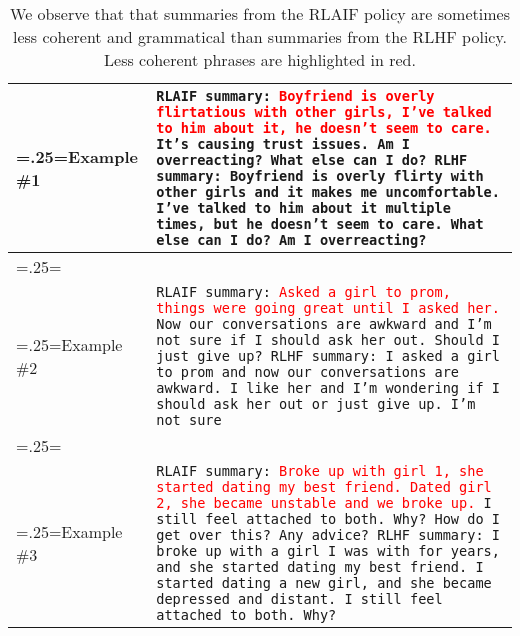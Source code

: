 \documentclass[11pt]{article}
\begin{document}
\begin{table*}[ht]
\small
\centering

    \begin{tabularx}{\linewidth}{>{\hsize=.25\hsize\linewidth=\hsize}X|X}
    Example \#1 & \texttt{RLAIF summary: \textcolor{red}{Boyfriend is overly flirtatious with other girls, I've talked to him about it, he doesn't seem to care.} It's causing trust issues. Am I overreacting? What else can I do?
    \newline
    \newline
    RLHF summary: Boyfriend is overly flirty with other girls and it makes me uncomfortable. I've talked to him about it multiple times, but he doesn't seem to care. What else can I do? Am I overreacting?
    \newline} \\
    \hline
    \\
    Example \#2 & \texttt{RLAIF summary: \textcolor{red}{Asked a girl to prom, things were going great until I asked her.} Now our conversations are awkward and I'm not sure if I should ask her out.  Should I just give up?
    \newline
    \newline
    RLHF summary: I asked a girl to prom and now our conversations are awkward. I like her and I'm wondering if I should ask her out or just give up. I'm not sure
    \newline} \\
    \hline
    \\
    Example \#3 & \texttt{RLAIF summary: \textcolor{red}{Broke up with girl 1, she started dating my best friend. Dated girl 2, she became unstable and we broke up.} I still feel attached to both. Why?  How do I get over this?  Any advice?
    \newline
    \newline
    RLHF summary: I broke up with a girl I was with for years, and she started dating my best friend. I started dating a new girl, and she became depressed and distant. I still feel attached to both. Why?} \\
    \end{tabularx}
    
    \caption{We observe that that summaries from the RLAIF policy are sometimes less coherent and grammatical than summaries from the RLHF policy. Less coherent phrases are highlighted in red.}
    \label{table:rlaif_vs_rlhf_coherence}
\end{table*}
\end{document}
